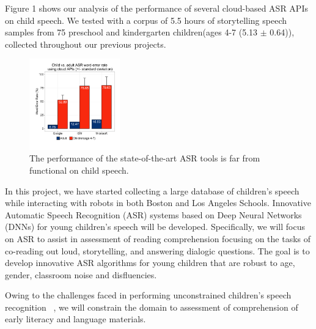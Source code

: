 Figure 1 shows our analysis of the performance of several cloud-based ASR APIs on child speech. We tested with a corpus of 5.5 hours of storytelling speech samples from 75 preschool and kindergarten children(ages 4-7 (5.13 $\pm$ 0.64)), collected throughout our previous projects.

\begin{figure}
  \centering
  \includegraphics[width=0.35\textwidth]{fig/asr.pdf}  
  \caption{The performance of the state-of-the-art ASR tools is far from functional on child speech.}
  \label{fig:jibo1}
\end{figure}

In this project, we have started collecting a large database of children's speech while interacting with robots in both Boston and Los Angeles Schools. Innovative Automatic Speech Recognition (ASR) systems based on Deep Neural Networks (DNNs) for young children's speech will be developed. Specifically, we will focus on ASR to assist in assessment of reading comprehension focusing on the tasks of co-reading out loud, storytelling, and answering dialogic questions. The goal is to develop innovative ASR algorithms for young children that are robust to age, gender, classroom noise and disfluencies.
 
Owing to the challenges faced in performing unconstrained children's speech recognition ~\cite{fainberg2016improving}, we will constrain the domain to assessment of comprehension  of early literacy and language materials. %

